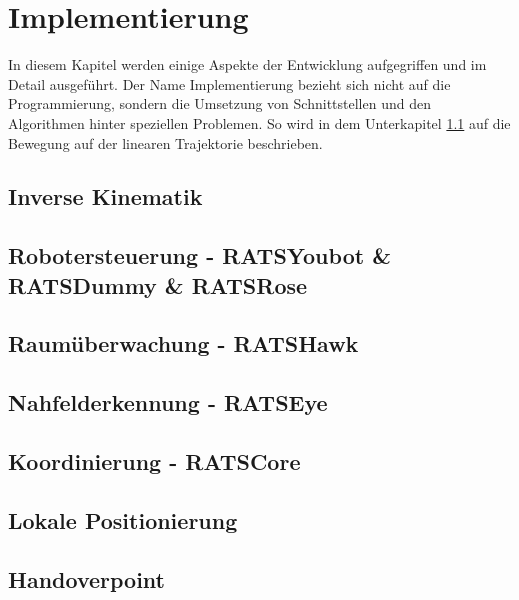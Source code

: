 \section{Implementierung}
\label{sec:impl}

In diesem Kapitel werden einige Aspekte der Entwicklung aufgegriffen und im Detail ausgeführt. Der Name Implementierung bezieht sich nicht auf die Programmierung, sondern die Umsetzung von Schnittstellen und den Algorithmen hinter speziellen Problemen. So wird in dem Unterkapitel \ref{sec:impl-ik} auf die Bewegung auf der linearen Trajektorie beschrieben.

\subsection{Inverse Kinematik}
\label{sec:impl-ik}
\subsection{Robotersteuerung - RATSYoubot \& RATSDummy \& RATSRose}
\subsection{Raumüberwachung - RATSHawk}
\subsection{Nahfelderkennung - RATSEye}
\subsection{Koordinierung - RATSCore}
\subsection{Lokale Positionierung}
\subsection{Handoverpoint}
